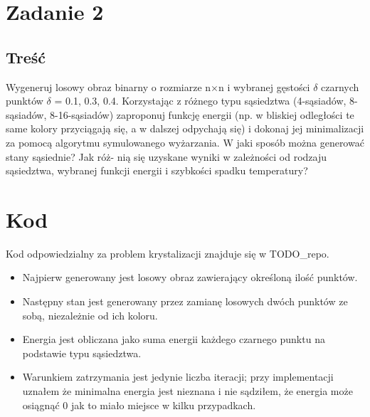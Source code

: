 \section{Zadanie 2}
\subsection{Treść} 
Wygeneruj losowy obraz binarny o rozmiarze n$\times$n i wybranej gęstości $\delta$ czarnych punktów
$\delta$ = 0.1, 0.3, 0.4. Korzystając z różnego typu sąsiedztwa (4-sąsiadów, 8-sąsiadów,
8-16-sąsiadów) zaproponuj funkcję energii (np. w bliskiej odległości te same kolory przyciągają
się, a w dalszej odpychają się) i dokonaj jej minimalizacji za pomocą algorytmu
symulowanego wyżarzania. W jaki sposób można generować stany sąsiednie? Jak róż-
nią się uzyskane wyniki w zależności od rodzaju sąsiedztwa, wybranej funkcji energii i
szybkości spadku temperatury?
\section{Kod}
Kod odpowiedzialny za problem krystalizacji znajduje się w TODO\_repo.
\begin{itemize}
\item Najpierw generowany jest losowy obraz zawierający określoną ilość punktów.
\item Następny stan jest generowany przez zamianę losowych dwóch punktów ze sobą, niezależnie od ich koloru.
\item Energia jest obliczana jako suma energii każdego czarnego punktu na podstawie typu sąsiedztwa.
\item Warunkiem zatrzymania jest jedynie liczba iteracji; przy implementacji uznałem że minimalna energia jest nieznana i nie sądziłem, że energia może osiągnąć 0 jak to miało miejsce w kilku przypadkach.
\end{itemize}


